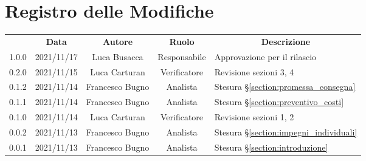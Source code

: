 \thispagestyle{empty}
\section*{Registro delle Modifiche}

\begin{center}
\renewcommand{\arraystretch}{1.8}
\begin{longtable}[c]{c | c | c | c | p{5cm}}
\rowcolor[HTML]{125E28}
\multicolumn{1}{c}{\color[HTML]{FFFFFF} \textbf{Versione}} & 
\multicolumn{1}{c}{\color[HTML]{FFFFFF} \textbf{Data}} & 
\multicolumn{1}{c}{\color[HTML]{FFFFFF} \textbf{Autore}} & 
\multicolumn{1}{c}{\color[HTML]{FFFFFF} \textbf{Ruolo}} & 
\multicolumn{1}{c}{\color[HTML]{FFFFFF} \textbf{Descrizione}} \\

1.0.0 & 2021/11/17 & Luca Busacca & Responsabile & Approvazione per il rilascio \\ \hline

0.2.0 & 2021/11/15 & Luca Carturan & Verificatore & Revisione sezioni 3, 4 \\ \hline

0.1.2 & 2021/11/14 & Francesco Bugno & Analista & Stesura §\ref{section:promessa_consegna} \\ \hline
0.1.1 & 2021/11/14 & Francesco Bugno & Analista & Stesura §\ref{section:preventivo_costi} \\ \hline
0.1.0 & 2021/11/14 & Luca Carturan & Verificatore & Revisione sezioni 1, 2\\ \hline

0.0.2 & 2021/11/13 & Francesco Bugno & Analista & Stesura §\ref{section:impegni_individuali} \\ \hline
0.0.1 & 2021/11/13 & Francesco Bugno & Analista & Stesura §\ref{section:introduzione} \\

\end{longtable}

\end{center}